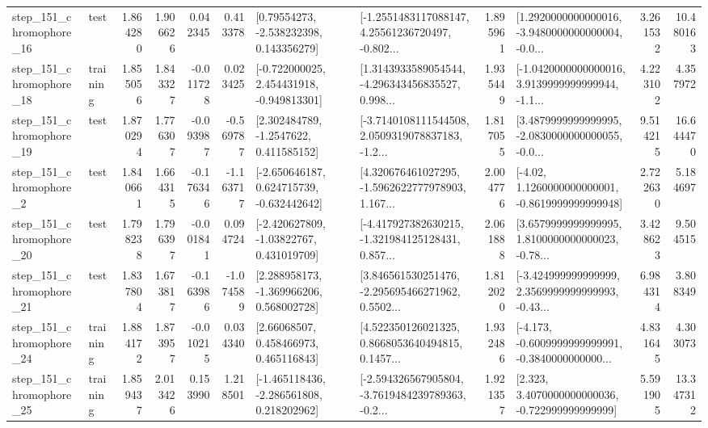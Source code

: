 \begin{tabular}{llrrrrllrlrr}
  step\_151\_chromophore\_16 &      test &      1.864280 &    1.906626 &      0.042345 &  0.413378 &     [0.79554273, -2.538232398, 0.143356279] &  [-1.2551483117088147, 4.25561236720497, -0.802... &       1.895961 &  [1.2920000000000016, -3.9480000000000004, -0.0... &            3.261532 &         10.480163 \\
  step\_151\_chromophore\_18 &  training &      1.855056 &    1.843327 &     -0.011728 &  0.023425 &   [-0.722000025, 2.454431918, -0.949813301] &  [1.3143933589054544, -4.296343456835527, 0.998... &       1.935449 &  [-1.0420000000000016, 3.9139999999999944, -1.1... &            4.223102 &          4.357972 \\
  step\_151\_chromophore\_19 &      test &      1.870294 &    1.776307 &     -0.093987 & -0.569787 &      [2.302484789, -1.2547622, 0.411585152] &  [-3.7140108111544508, 2.0509319078837183, -1.2... &       1.817055 &  [3.4879999999999995, -2.0830000000000055, -0.0... &            9.514215 &         16.644470 \\
   step\_151\_chromophore\_2 &      test &      1.840661 &    1.664315 &     -0.176346 & -1.163717 &   [-2.650646187, 0.624715739, -0.632442642] &  [4.320676461027295, -1.5962622777978903, 1.167... &       2.004776 &   [-4.02, 1.1260000000000001, -0.8619999999999948] &            2.722630 &          5.184697 \\
  step\_151\_chromophore\_20 &      test &      1.798238 &    1.796397 &     -0.001841 &  0.094724 &    [-2.420627809, -1.03822767, 0.431019709] &  [-4.417927382630215, -1.321984125128431, 0.857... &       2.061888 &  [3.6579999999999995, 1.8100000000000023, -0.78... &            3.428623 &          9.504515 \\
  step\_151\_chromophore\_21 &      test &      1.837804 &    1.673817 &     -0.163986 & -1.074589 &    [2.288958173, -1.369966206, 0.568002728] &  [3.846561530251476, -2.295695466271962, 0.5502... &       1.812020 &  [-3.424999999999999, 2.3569999999999993, -0.43... &            6.984314 &          3.808349 \\
  step\_151\_chromophore\_24 &  training &      1.884172 &    1.873957 &     -0.010215 &  0.034340 &      [2.66068507, 0.458466973, 0.465116843] &  [4.522350126021325, 0.8668053640494815, 0.1457... &       1.932486 &  [-4.173, -0.6009999999999991, -0.3840000000000... &            4.831645 &          4.303073 \\
  step\_151\_chromophore\_25 &  training &      1.859437 &    2.013426 &      0.153990 &  1.218501 &   [-1.465118436, -2.286561808, 0.218202962] &  [-2.594326567905804, -3.7619484239789363, -0.2... &       1.921357 &    [2.323, 3.4070000000000036, -0.722999999999999] &            5.591905 &         13.347312 \\

\end{tabular}
